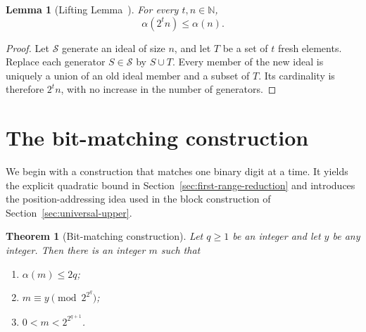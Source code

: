\documentclass[11pt]{article}
\newtheorem{theorem}{Theorem}[section]
\newtheorem{lemma}[lemma]{Lemma}
\theoremstyle{definition}
\theoremstyle{remark}
\begin{document}
\begin{lemma}[Lifting Lemma~\cite{ChandranGajjalaMeel26}]\label{lem:lifting}
For every $t,n\in\mathbb N$,
\[
  \alpha(2^t n)\le\alpha(n).
\]
\end{lemma}

\begin{proof}
Let $\mathcal S$ generate an ideal of size $n$, and let $T$ be a set of
$t$ fresh elements. Replace each generator $S\in\mathcal S$ by $S\cup T$.
Every member of the new ideal is uniquely a union of an old ideal member
and a subset of $T$. Its cardinality is therefore $2^t n$, with no increase
in the number of generators.
\end{proof}

\section{The bit-matching construction}\label{sec:bit-matching}

We begin with a construction that matches one binary digit at a time.
It yields the explicit quadratic bound in Section~\ref{sec:first-range-reduction}
and introduces the position-addressing idea used in the block construction
of Section~\ref{sec:universal-upper}.

\begin{theorem}[Bit-matching construction]\label{thm:bit-matching}
Let $q\ge1$ be an integer and let $y$ be any integer.
Then there is an integer $m$ such that
\begin{enumerate}[label=\textup{(\roman*)}]
  \item $\alpha(m)\le2q$;
  \item $m\equiv y\pmod{2^{2^q}}$;
  \item $0<m<2^{2^{q+1}}$.
\end{enumerate}
\end{theorem}
\end{document}
